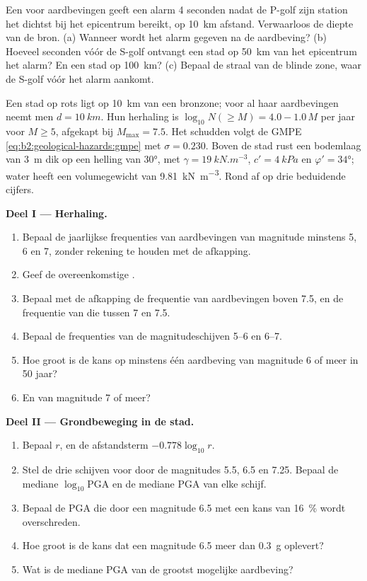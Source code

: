 \begin{exercise}[$\star\star\star$]\label{exo:b2:geological-hazards:12}
Een  voor aardbevingen geeft een alarm 4 seconden nadat de P-golf zijn station
het dichtst bij het epicentrum bereikt, op \qty{10}{km} afstand. Verwaarloos de diepte van de bron. (a) Wanneer wordt het
alarm gegeven na de aardbeving? (b) Hoeveel seconden vóór de S-golf ontvangt een stad op \qty{50}{km}
van het epicentrum het alarm? En een stad op \qty{100}{km}? (c) Bepaal de straal van de blinde zone, waar
de S-golf vóór het alarm aankomt.
\end{exercise}

\begin{problem}\label{pb:b2:geological-hazards:1}
Een stad op rots ligt op \qty{10}{km} van een bronzone; voor al haar aardbevingen neemt men
$d = \qty{10}{km}$. Hun herhaling is $\log_{10} N(\geq M) = 4.0 - 1.0\,M$ per jaar voor $M \geq 5$,
afgekapt bij $M_{\max} = 7.5$. Het schudden volgt de GMPE \eqref{eq:b2:geological-hazards:gmpe}
met $\sigma = 0.230$. Boven de stad rust een bodemlaag van \qty{3}{m} dik op een helling van \ang{30},
met $\gamma = \qty{19}{kN.m^{-3}}$, $c' = \qty{4}{kPa}$ en $\varphi' = \ang{34}$; water heeft een
volumegewicht van \qty{9.81}{kN.m^{-3}}. Rond af op drie beduidende cijfers.

\noindent\textbf{Deel I --- Herhaling.}
\begin{enumerate}
  \item Bepaal de jaarlijkse frequenties van aardbevingen van magnitude minstens 5, 6 en 7, zonder rekening
        te houden met de afkapping.
  \item Geef de overeenkomstige .
  \item Bepaal met de afkapping de frequentie van aardbevingen boven 7.5, en de frequentie van die tussen 7
        en 7.5.
  \item Bepaal de frequenties van de magnitudeschijven 5--6 en 6--7.
  \item Hoe groot is de kans op minstens één aardbeving van magnitude 6 of meer in 50 jaar?
  \item En van magnitude 7 of meer?
\end{enumerate}

\noindent\textbf{Deel II --- Grondbeweging in de stad.}
\begin{enumerate}[resume]
  \item Bepaal $r$, en de afstandsterm $-0.778\log_{10} r$.
  \item Stel de drie schijven voor door de magnitudes 5.5, 6.5 en 7.25. Bepaal de mediane
        $\log_{10}\mathrm{PGA}$ en de mediane PGA van elke schijf.
  \item Bepaal de PGA die door een magnitude 6.5 met een kans van \qty{16}{\percent} wordt overschreden.
  \item Hoe groot is de kans dat een magnitude 6.5 meer dan \qty{0.3}{g} oplevert?
  \item Wat is de mediane PGA van de grootst mogelijke aardbeving?
\end{enumerate}


\end{problem}
